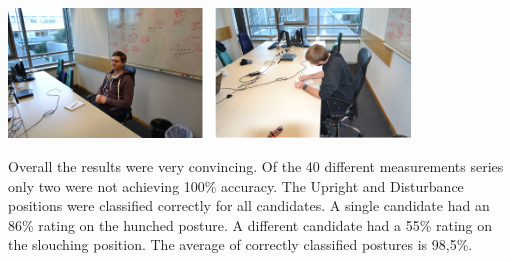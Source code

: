 \begin{minipage}{\linewidth}
\centering
\includegraphics[width=0.8\textwidth]{images/prot_capchair_eval_pos2}
\label{fig:prot_capchair_eval_pos2}
\end{minipage}

Overall the results were very convincing. Of the 40 different measurements series only two were not achieving 100\% accuracy. The Upright and Disturbance positions were classified correctly for all candidates. A single candidate had an 86\% rating on the hunched posture. A different candidate had a 55\% rating on the slouching position. The average of correctly classified postures is 98,5\%.


